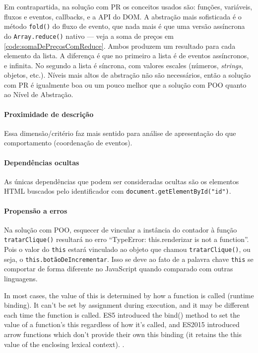 Em contrapartida, na solução com PR os conceitos usados são: funções,
variáveis, fluxos e eventos, callbacks, e a API do DOM.
A abstração mais sofisticada é o método \texttt{fold()} do fluxo de evento,
que nada mais é que uma versão assíncrona do \texttt{Array.reduce()}
nativo --- veja a soma de preços em \ref{code:somaDePreçosComReduce}.
Ambos produzem um resultado para cada elemento da lista.
A diferença é que no primeiro a lista é de eventos assíncronos, e infinita.
No segundo a lista é síncrona, com valores escales (números, \emph{strings},
objetos, etc.).
Níveis mais altos de abstração não são necessários, então a solução com PR
é igualmente boa ou um pouco melhor que a solução com POO quanto ao Nível
de Abstração.

\paragraph{Proximidade de descrição}
\label{sec:orgc9c6145}
Essa dimensão/critério faz mais sentido para análise de apresentação do que
comportamento (coordenação de eventos).

\paragraph{Dependências ocultas}
\label{sec:orgc129516}
As únicas dependências que podem ser consideradas ocultas são os elementos
HTML buscados pelo identificador com \texttt{document.getElementById("id")}.

\paragraph{Propensão a erros}
\label{sec:org610ef5a}
Na solução com POO, esquecer de vincular a instância do contador à função
\texttt{tratarClique()} resultará no erro “TypeError: this.renderizar is not a
function”.
Pois o valor do \texttt{this} estará vinculado ao objeto que chamou
\texttt{tratarClique()}, ou seja, o \texttt{this.botãoDeIncrementar}.
Isso se deve ao fato de a palavra chave \texttt{this} se comportar de forma
diferente no JavaScript quando comparado com outras linguagens.

\begin{citacao}
In most cases, the value of this is determined by how a function is called
(runtime binding). It can't be set by assignment during execution, and it
may be different each time the function is called. ES5 introduced the
bind() method to set the value of a function's this regardless of how it's
called, and ES2015 introduced arrow functions which don't provide their own
this binding (it retains the this value of the enclosing lexical context).
\cite{This2020}.
\end{citacao}

